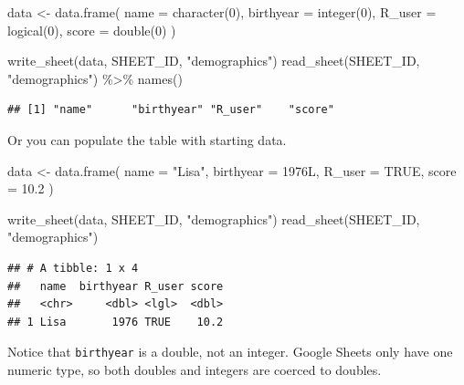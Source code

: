 \documentclass[
  oneside]{book}
\newenvironment{Shaded}{\begin{snugshade}}{\end{snugshade}}
\newcommand{\AttributeTok}[1]{\textcolor[rgb]{0.77,0.63,0.00}{#1}}
\newcommand{\ConstantTok}[1]{\textcolor[rgb]{0.00,0.00,0.00}{#1}}
\newcommand{\DecValTok}[1]{\textcolor[rgb]{0.00,0.00,0.81}{#1}}
\newcommand{\FloatTok}[1]{\textcolor[rgb]{0.00,0.00,0.81}{#1}}
\newcommand{\FunctionTok}[1]{\textcolor[rgb]{0.00,0.00,0.00}{#1}}
\newcommand{\NormalTok}[1]{#1}
\newcommand{\OtherTok}[1]{\textcolor[rgb]{0.56,0.35,0.01}{#1}}
\newcommand{\SpecialCharTok}[1]{\textcolor[rgb]{0.00,0.00,0.00}{#1}}
\newcommand{\StringTok}[1]{\textcolor[rgb]{0.31,0.60,0.02}{#1}}
\begin{document}
\begin{Shaded}
\begin{Highlighting}[]
\NormalTok{data }\OtherTok{\textless{}{-}} \FunctionTok{data.frame}\NormalTok{(}
  \AttributeTok{name =} \FunctionTok{character}\NormalTok{(}\DecValTok{0}\NormalTok{),}
  \AttributeTok{birthyear =} \FunctionTok{integer}\NormalTok{(}\DecValTok{0}\NormalTok{),}
  \AttributeTok{R\_user =} \FunctionTok{logical}\NormalTok{(}\DecValTok{0}\NormalTok{),}
  \AttributeTok{score =} \FunctionTok{double}\NormalTok{(}\DecValTok{0}\NormalTok{)}
\NormalTok{)}

\FunctionTok{write\_sheet}\NormalTok{(data, SHEET\_ID, }\StringTok{"demographics"}\NormalTok{)}
\FunctionTok{read\_sheet}\NormalTok{(SHEET\_ID, }\StringTok{"demographics"}\NormalTok{) }\SpecialCharTok{\%\textgreater{}\%} \FunctionTok{names}\NormalTok{()}
\end{Highlighting}
\end{Shaded}

\begin{verbatim}
## [1] "name"      "birthyear" "R_user"    "score"
\end{verbatim}

Or you can populate the table with starting data.

\begin{Shaded}
\begin{Highlighting}[]
\NormalTok{data }\OtherTok{\textless{}{-}} \FunctionTok{data.frame}\NormalTok{(}
  \AttributeTok{name =} \StringTok{"Lisa"}\NormalTok{,}
  \AttributeTok{birthyear =}\NormalTok{ 1976L,}
  \AttributeTok{R\_user =} \ConstantTok{TRUE}\NormalTok{,}
  \AttributeTok{score =} \FloatTok{10.2}
\NormalTok{)}

\FunctionTok{write\_sheet}\NormalTok{(data, SHEET\_ID, }\StringTok{"demographics"}\NormalTok{)}
\FunctionTok{read\_sheet}\NormalTok{(SHEET\_ID, }\StringTok{"demographics"}\NormalTok{)}
\end{Highlighting}
\end{Shaded}

\begin{verbatim}
## # A tibble: 1 x 4
##   name  birthyear R_user score
##   <chr>     <dbl> <lgl>  <dbl>
## 1 Lisa       1976 TRUE    10.2
\end{verbatim}

\begin{info}
Notice that \texttt{birthyear} is a double, not an integer. Google Sheets only have one numeric type, so both doubles and integers are coerced to doubles.

\end{info}
\end{document}
